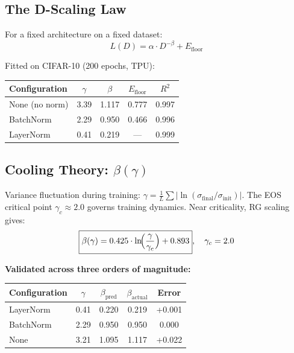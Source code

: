 \documentclass[11pt, a4paper]{article}
\theoremstyle{plain}
\begin{document}
\subsection{The D-Scaling Law}

For a fixed architecture on a fixed dataset:
\begin{equation}
\boxed{L(D) = \alpha \cdot D^{-\beta} + E_{\mathrm{floor}}}
\end{equation}

Fitted on CIFAR-10 (200 epochs, TPU):

\begin{center}
\begin{tabular}{lcccc}
\toprule
Configuration & $\gamma$ & $\beta$ & $E_{\mathrm{floor}}$ & $R^2$ \\
\midrule
None (no norm) & 3.39 & 1.117 & 0.777 & 0.997 \\
BatchNorm & 2.29 & 0.950 & 0.466 & 0.996 \\
LayerNorm & 0.41 & 0.219 & — & 0.999 \\
\bottomrule
\end{tabular}
\end{center}

\subsection{Cooling Theory: $\beta(\gamma)$}

Variance fluctuation during training: $\gamma = \frac{1}{L}\sum|\ln(\sigma_{\mathrm{final}}/\sigma_{\mathrm{init}})|$. The EOS critical point $\gamma_c \approx 2.0$ governs training dynamics. Near criticality, RG scaling gives:
\begin{equation}
\boxed{\beta(\gamma) = 0.425 \cdot \ln\!\Bigl(\frac{\gamma}{\gamma_c}\Bigr) + 0.893}, \quad \gamma_c = 2.0
\end{equation}

\textbf{Validated across three orders of magnitude:}
\begin{center}
\begin{tabular}{lcccc}
\toprule
Configuration & $\gamma$ & $\beta_{\mathrm{pred}}$ & $\beta_{\mathrm{actual}}$ & Error \\
\midrule
LayerNorm & 0.41 & 0.220 & 0.219 & +0.001 \\
BatchNorm & 2.29 & 0.950 & 0.950 & 0.000 \\
None & 3.21 & 1.095 & 1.117 & +0.022 \\
\bottomrule
\end{tabular}
\end{center}
\end{document}
